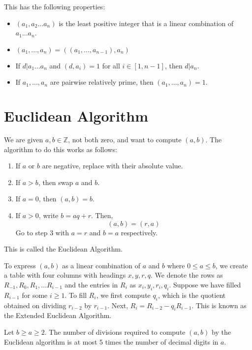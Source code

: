 \documentclass[12pt,letterpaper]{amsbook}
\theoremstyle{definition}
\newcommand{\Z}{\mathbb{Z}}
\begin{document}
This has the following properties:

\begin{itemize}
  \item $(a_1,a_2...a_n)$ is the least positive integer that is a linear combination of $a_1...a_n$.
  \item $(a_1,...,a_n) = ((a_1,...,a_{n-1}),a_n)$
  \item If $d | a_1...a_n$ and $(d,a_i) = 1$ for all $i \in [1,n-1]$, then $d|a_n$.
  \item If $a_1,...,a_n$ are pairwise relatively prime, then $(a_1,...,a_n) = 1$.
\end{itemize}

\section{Euclidean Algorithm}

We are given $a,b \in \Z$, not both zero, and want to compute $(a,b)$. The algorithm to do this works as follows:

\begin{enumerate}
  \item If $a$ or $b$ are negative, replace with their absolute value.
    \item If $a > b$, then swap $a$ and $b$.
    \item If $a = 0$, then $(a,b) = b$.
    \item If $a >0$, write $b = aq+r$. Then, 
      \[(a,b) = (r,a)\]
      Go to step 3 with $a = r$ and $b=a$ respectively.
\end{enumerate}

This is called the Euclidean Algorithm. 

To express $(a,b)$ as a linear combination of $a$ and $b$ where $0 \leq a \leq b$, we create a table with four columns with headings $x,y,r,q$. We denote the rows as $R_{-1}, R_0, R_1, ... R_{i-1}$ and the entries in $R_i$ as $x_i,y_i,r_i,q_i$. Suppose we have filled $R_{i-1}$ for some $i \geq 1$. To fill $R_i$, we first compute $q_i$, which is the quotient obtained on dividing $r_{i-2}$ by $r_{i-1}$. Next, $R_i = R_{i-2} - q_iR_{i-1}$. This is known as the Extended Euclidean Algorithm.

\begin{theorem}
  Let $b \geq a \geq 2$. The number of divisions required to compute $(a,b)$ by the Euclidean algorithm is at most 5 times the number of decimal digits in $a$.  
\end{theorem}
\end{document}

